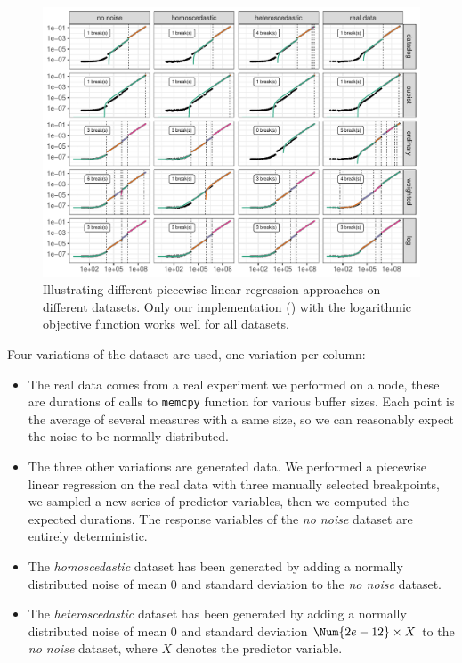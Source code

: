                 \begin{figure}[htb]
                    \centering
                    \includegraphics[width=\linewidth]{img/prediction/modeling/network/pycewise.pdf}
                    \caption{Illustrating different piecewise linear regression approaches on different datasets. Only
                    our implementation (\pyce) with the logarithmic objective function works well for all datasets.}%
                    \label{fig:prediction:pycewise}
                \end{figure}

                Four variations of the dataset are used, one variation per column:
                \begin{itemize}
                    \item The real data comes from a real experiment we performed on a node, these are durations of
                        calls to \texttt{memcpy} function for various buffer sizes. Each point is the average of several
                        measures with a same size, so we can reasonably expect the noise to be normally distributed.
                    \item The three other variations are generated data. We performed a piecewise linear regression on
                        the real data with three manually selected breakpoints, we sampled a new series of predictor
                        variables, then we computed the expected durations. The response variables of the \emph{no
                        noise} dataset are entirely deterministic.
                    \item The \emph{homoscedastic} dataset has been generated by adding a normally distributed noise of
                        mean 0 and standard deviation  to the \emph{no noise} dataset.
                    \item The \emph{heteroscedastic} dataset has been generated by adding a normally distributed noise
                        of mean 0 and standard deviation \(\Num{2e-12}\times X\) to the \emph{no noise} dataset, where
                        \(X\) denotes the predictor variable.
                \end{itemize}

